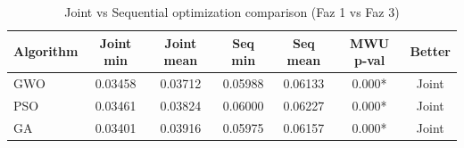 \begin{table}[htbp]
\centering
\caption{Joint vs Sequential optimization comparison (Faz 1 vs Faz 3)}
\label{tab:joint_vs_seq}
\begin{tabular}{lcccccc}
\hline
Algorithm & Joint min & Joint mean & Seq min & Seq mean & MWU p-val & Better \\
\hline
GWO      & 0.03458 & 0.03712 & 0.05988 & 0.06133 & 0.000* & Joint \\
PSO      & 0.03461 & 0.03824 & 0.06000 & 0.06227 & 0.000* & Joint \\
GA       & 0.03401 & 0.03916 & 0.05975 & 0.06157 & 0.000* & Joint \\
\hline
\end{tabular}
\end{table}